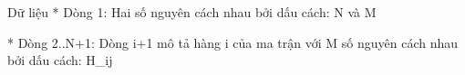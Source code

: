 Dữ liệu
* Dòng 1: Hai số nguyên cách nhau bởi dấu cách: N và M  

   * Dòng 2..N+1: Dòng i+1 mô tả hàng i của ma trận với M số nguyên cách nhau bởi dấu cách: H\_ij